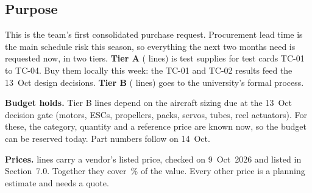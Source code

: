 \documentclass[final]{dbfdoc}
\begin{document}
\begin{frontmatter}
\section{Purpose}
\noindent\begin{minipage}[t]{0.62\textwidth}
\setlength\parindent{1.15em}\noindent
This is the team's first consolidated purchase request. Procurement lead time is the main schedule risk this season, so everything the next two months need is requested now, in two tiers.
\textbf{Tier A} (\prLinesA{} lines) is test supplies for test cards TC-01 to TC-04. Buy them locally this week: the TC-01 and TC-02 results feed the 13~Oct design decisions.
\textbf{Tier B} (\prLinesB{} lines) goes to the university's formal process.

\noindent\textbf{Budget holds.} \prLinesHold{} Tier B lines depend on the aircraft sizing due at the 13~Oct decision gate (motors, ESCs, propellers, packs, servos, tubes, reel actuators). For these, the category, quantity and a reference price are known now, so the budget can be reserved today. Part numbers follow on 14~Oct.

\noindent\textbf{Prices.} \prListedLines{} lines carry a vendor's listed price, checked on 9~Oct~2026 and listed in Section~7.0. Together they cover \prListedShare\,\% of the value. Every other price is a planning estimate and needs a quote.
\end{minipage}\hfill
\begin{minipage}[t]{0.35\textwidth}
\vspace{-11pt}
\begin{dbfpanel}
\hfill{}\dbfreadoutgap
{}\hfill{}\dbfreadoutgap
{}\hfill{}
\end{dbfpanel}
\end{minipage}
\end{frontmatter}
\end{document}

